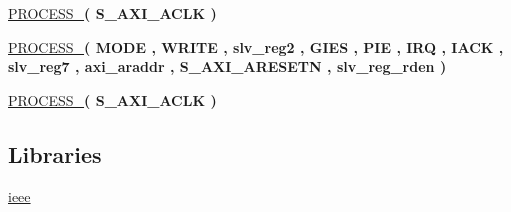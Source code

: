 \begin{DoxyCompactItemize}
\item 
\hypertarget{group___a_x_i-internal_ga7390c9b34974c278e7646b784061d076}{\hyperlink{group___a_x_i-internal_ga7390c9b34974c278e7646b784061d076}{P\+R\+O\+C\+E\+S\+S\+\_}{\bfseries  ( {\bfseries \textcolor{vhdlchar}{S\+\_\+\+A\+X\+I\+\_\+\+A\+C\+L\+K}\textcolor{vhdlchar}{ }} )}}\label{group___a_x_i-internal_ga7390c9b34974c278e7646b784061d076}

\item 
\hypertarget{group___a_x_i-internal_ga8535d024ca678c89fc4a3db53a176093}{\hyperlink{group___a_x_i-internal_ga8535d024ca678c89fc4a3db53a176093}{P\+R\+O\+C\+E\+S\+S\+\_}{\bfseries  ( {\bfseries \textcolor{vhdlchar}{M\+O\+D\+E}\textcolor{vhdlchar}{ }} , {\bfseries \textcolor{vhdlchar}{W\+R\+I\+T\+E}\textcolor{vhdlchar}{ }} , {\bfseries \textcolor{vhdlchar}{slv\+\_\+reg2}\textcolor{vhdlchar}{ }} , {\bfseries \textcolor{vhdlchar}{G\+I\+E\+S}\textcolor{vhdlchar}{ }} , {\bfseries \textcolor{vhdlchar}{P\+I\+E}\textcolor{vhdlchar}{ }} , {\bfseries \textcolor{vhdlchar}{I\+R\+Q}\textcolor{vhdlchar}{ }} , {\bfseries \textcolor{vhdlchar}{I\+A\+C\+K}\textcolor{vhdlchar}{ }} , {\bfseries \textcolor{vhdlchar}{slv\+\_\+reg7}\textcolor{vhdlchar}{ }} , {\bfseries \textcolor{vhdlchar}{axi\+\_\+araddr}\textcolor{vhdlchar}{ }} , {\bfseries \textcolor{vhdlchar}{S\+\_\+\+A\+X\+I\+\_\+\+A\+R\+E\+S\+E\+T\+N}\textcolor{vhdlchar}{ }} , {\bfseries \textcolor{vhdlchar}{slv\+\_\+reg\+\_\+rden}\textcolor{vhdlchar}{ }} )}}\label{group___a_x_i-internal_ga8535d024ca678c89fc4a3db53a176093}

\item 
\hypertarget{group___a_x_i-internal_ga45eef1701e94703c5a3cf169c02e5e2c}{\hyperlink{group___a_x_i-internal_ga45eef1701e94703c5a3cf169c02e5e2c}{P\+R\+O\+C\+E\+S\+S\+\_}{\bfseries  ( {\bfseries \textcolor{vhdlchar}{S\+\_\+\+A\+X\+I\+\_\+\+A\+C\+L\+K}\textcolor{vhdlchar}{ }} )}}\label{group___a_x_i-internal_ga45eef1701e94703c5a3cf169c02e5e2c}

\end{DoxyCompactItemize}
\subsection*{Libraries}
 \begin{DoxyCompactItemize}
\item 
\hypertarget{group___a_x_i-internal_ga0a6af6eef40212dbaf130d57ce711256}{\hyperlink{group___a_x_i-internal_ga0a6af6eef40212dbaf130d57ce711256}{ieee} }\label{group___a_x_i-internal_ga0a6af6eef40212dbaf130d57ce711256}

\end{DoxyCompactItemize}
